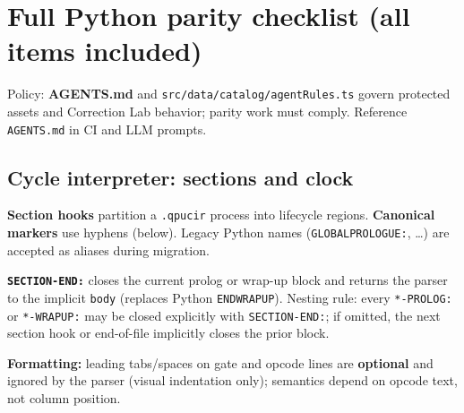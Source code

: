 \documentclass[11pt,a4paper]{article}
\begin{document}
\section{Full Python parity checklist (all items included)}
\label{sec:full-checklist}

Policy: \textbf{AGENTS.md} and \texttt{src/data/catalog/agentRules.ts} govern protected assets and Correction Lab behavior; parity work must comply. Reference \texttt{AGENTS.md} in CI and LLM prompts.

\subsection{Cycle interpreter: sections and clock}

\textbf{Section hooks} partition a \texttt{.qpucir} process into lifecycle regions. \textbf{Canonical markers} use hyphens (below). Legacy Python names (\texttt{GLOBALPROLOGUE:}, \ldots) are accepted as aliases during migration.

\textbf{\texttt{SECTION-END:}} closes the current prolog or wrap-up block and returns the parser to the implicit \texttt{body} (replaces Python \texttt{ENDWRAPUP}). Nesting rule: every \texttt{*-PROLOG:} or \texttt{*-WRAPUP:} may be closed explicitly with \texttt{SECTION-END:}; if omitted, the next section hook or end-of-file implicitly closes the prior block.

\textbf{Formatting:} leading tabs/spaces on gate and opcode lines are \textbf{optional} and ignored by the parser (visual indentation only); semantics depend on opcode text, not column position.
\end{document}
